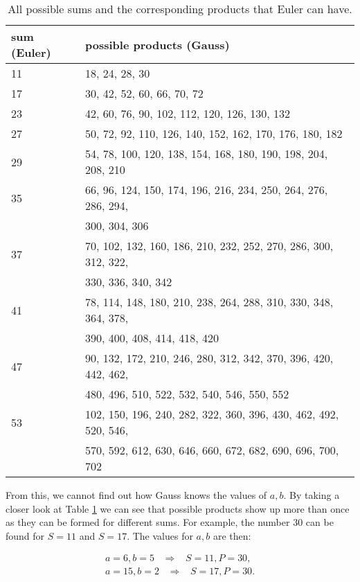 \documentclass{article}
\begin{document}
\begin{table}[h!]
\centering
\begin{tabular}{ll}
\toprule
\textbf{sum} (Euler) & \textbf{possible products} (Gauss) \\ \toprule
11 & 18, 24, 28, 30 \\ \midrule
17 & 30, 42, 52, 60, 66, 70, 72 \\ \midrule
23 & 42, 60, 76, 90, 102, 112, 120, 126, 130, 132 \\ \midrule
27 & 50, 72, 92, 110, 126, 140, 152, 162, 170, 176, 180, 182 \\ \midrule
29 & 54, 78, 100, 120, 138, 154, 168, 180, 190, 198, 204, 208, 210 \\ \midrule
35 & 66, 96, 124, 150, 174, 196, 216, 234, 250, 264, 276, 286, 294, \\ & 300, 304, 306 \\ \midrule
37 & 70, 102, 132, 160, 186, 210, 232, 252, 270, 286, 300, 312, 322, \\ & 330, 336, 340, 342 \\ \midrule
41 & 78, 114, 148, 180, 210, 238, 264, 288, 310, 330, 348, 364, 378, \\ & 390, 400, 408, 414, 418, 420 \\ \midrule
47 & 90, 132, 172, 210, 246, 280, 312, 342, 370, 396, 420, 442, 462, \\ & 480, 496, 510, 522, 532, 540, 546, 550, 552 \\ \midrule
53 & 102, 150, 196, 240, 282, 322, 360, 396, 430, 462, 492, 520, 546, \\ & 570, 592, 612, 630, 646, 660, 672, 682, 690, 696, 700, 702 \\ \bottomrule
\end{tabular}

\caption{All possible sums and the corresponding products that Euler can have.}
\label{full dubioses dict}

\end{table}

\newpage

From this, we cannot find out how Gauss knows the values of $a,b$. By taking a closer look at Table \ref{full dubioses dict} we can see that possible products show up more than once as they can be formed for different sums. For example, the number 30 can be found for $S = 11$ and $S = 17$. The values for $a,b$ are then:

\begin{align*}
    a = 6, b = 5 \hspace{10pt} \Rightarrow \hspace{10pt} S = 11, P = 30, \\
    a = 15, b = 2 \hspace{10pt} \Rightarrow \hspace{10pt} S = 17, P = 30.
\end{align*}
\end{document}
